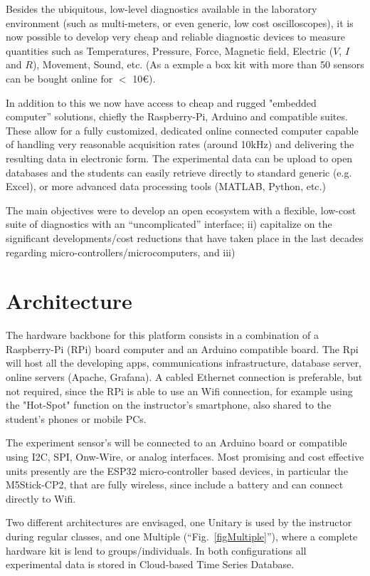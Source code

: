 \documentclass[conference]{IEEEtran}
\begin{document}
Besides the ubiquitous, low-level diagnostics available in the laboratory environment (such as multi-meters, or even generic, low cost oscilloscopes), 
it is now possible to develop very cheap and reliable diagnostic devices to measure quantities such as  
Temperatures, Pressure, Force, Magnetic field, Electric ($V$, $I$ and $R$), Movement, Sound, etc. 
(As a exmple a box kit with more than 50 sensors can be bought online for $<$ 10€).

In addition to this we now have access to cheap and rugged "embedded computer” solutions, chiefly the Raspberry-Pi, Arduino and compatible suites.
These allow for a fully customized, dedicated online connected computer capable of handling very reasonable acquisition rates (around 10kHz) 
and delivering the resulting data in electronic form. 
The experimental data can be upload to open databases and the students can easily retrieve 
 directly to standard generic (e.g. Excel), or more advanced data processing tools
 (MATLAB, Python, etc.)

The main objectives were to develop an open ecosystem with a flexible, low-cost suite of diagnostics with an ``uncomplicated'' interface; ii) capitalize on the significant developments/cost reductions that have taken place in the last decades regarding micro-controllers/microcomputers, and iii)

\section{Architecture}
The hardware backbone for this platform consists in a combination of a Raspberry-Pi (RPi) board computer and an Arduino compatible board. 
The Rpi will host all the developing apps, communications infrastructure, database server, online servers (Apache, Grafana). 
 A cabled Ethernet connection is preferable, but not  required, since the RPi is able to use an Wifi connection, 
 for example using the "Hot-Spot" function on the instructor’s smartphone, also shared to the student’s phones or mobile PCs.

 The experiment sensor's will be connected to an Arduino board or compatible using I2C, SPI, Onw-Wire, or analog interfaces.
 Most promising and cost effective units presently are the ESP32 micro-controller based devices, in particular the M5Stick-CP2,
 that are fully wireless, since include a battery and can connect directly to Wifi.

 Two different architectures are envisaged, one Unitary is used by the instructor during regular classes, 
 and one Multiple (``Fig.~\ref{figMultiple}''),
 where a complete hardware kit is lend to groups/individuals. 
 In both configurations all experimental data is stored in Cloud-based Time Series Database\cite{b3}.
 
\end{document}
